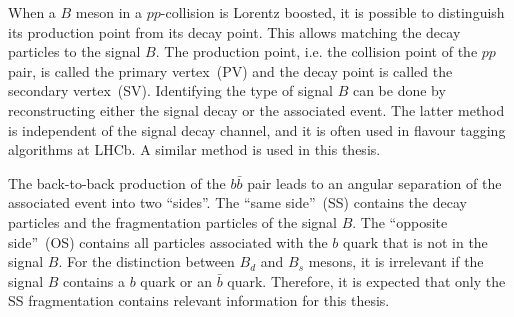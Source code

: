 When a $B$ meson in a $pp$-collision is Lorentz boosted, it is possible to distinguish its production point from its decay point.
This allows matching the decay particles to the signal $B$.
The production point, i.e. the collision point of the $pp$ pair, is called the primary vertex~(PV) and the decay point is called the secondary vertex~(SV).
Identifying the type of signal $B$ can be done by reconstructing either the signal decay or the associated event. 
The latter method is independent of the signal decay channel, and it is often used in flavour tagging algorithms at LHCb. 
A similar method is used in this thesis.

The back-to-back production of the $b\bar{b}$ pair leads to an angular separation of the associated event into two \enquote{sides}.
The \enquote{same side}~(SS) contains the decay particles and the fragmentation particles of the signal $B$.
The \enquote{opposite side}~(OS) contains all particles associated with the $b$ quark that is not in the signal $B$.
For the distinction between $B_d$ and $B_s$ mesons, it is irrelevant if the signal $B$ contains a $b$ quark or an $\bar{b}$ quark.
Therefore, it is expected that only the SS fragmentation contains relevant information for this thesis.
